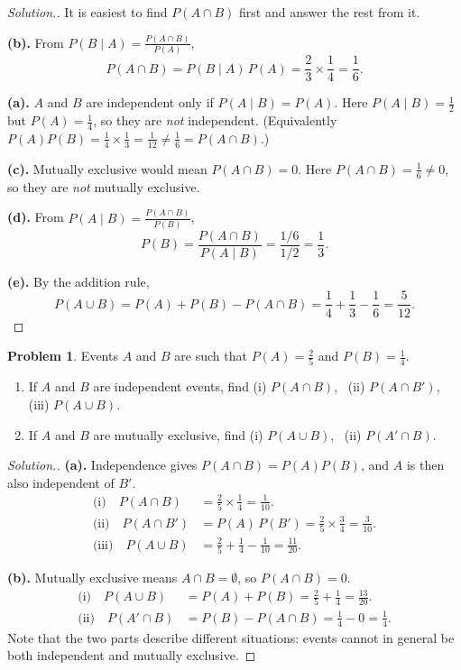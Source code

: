 \documentclass[12pt,a4paper]{report}
\theoremstyle{definition}
\theoremstyle{plain}
\theoremstyle{definition}
\newtheorem{problemx}{Problem}[section]
\newenvironment{problem}{\begin{problemx}}{\end{problemx}}
\newenvironment{solution}
  {\renewcommand{\qedsymbol}{}\begin{proof}[\textit{Solution}.]}
  {\end{proof}}
\begin{document}
\begin{solution}
It is easiest to find $P(A\cap B)$ first and answer the rest from it.

\textbf{(b).} From $P(B\mid A)=\frac{P(A\cap B)}{P(A)}$,
\[P(A\cap B) = P(B\mid A)\,P(A) = \frac{2}{3}\times\frac{1}{4} = \frac{1}{6}.\]

\textbf{(a).} $A$ and $B$ are independent only if $P(A\mid B)=P(A)$. Here
$P(A\mid B)=\tfrac12$ but $P(A)=\tfrac14$, so they are \emph{not} independent. (Equivalently
$P(A)P(B)=\tfrac14\times\tfrac13=\tfrac1{12}\neq\tfrac16=P(A\cap B)$.)

\textbf{(c).} Mutually exclusive would mean $P(A\cap B)=0$. Here $P(A\cap B)=\tfrac16\neq 0$,
so they are \emph{not} mutually exclusive.

\textbf{(d).} From $P(A\mid B)=\frac{P(A\cap B)}{P(B)}$,
\[P(B) = \frac{P(A\cap B)}{P(A\mid B)} = \frac{1/6}{1/2} = \frac{1}{3}.\]

\textbf{(e).} By the addition rule,
\[P(A\cup B) = P(A)+P(B)-P(A\cap B) = \frac{1}{4}+\frac{1}{3}-\frac{1}{6} = \frac{5}{12}.\]
\end{solution}

\begin{problem}
Events $A$ and $B$ are such that $P(A)=\frac{2}{5}$ and $P(B)=\frac{1}{4}$.
\begin{enumerate}
\item[(a).] If $A$ and $B$ are independent events, find
 (i) $P(A\cap B)$, \, (ii) $P(A\cap B')$, \, (iii) $P(A\cup B)$.
\item[(b).] If $A$ and $B$ are mutually exclusive, find
 (i) $P(A\cup B)$, \, (ii) $P(A'\cap B)$.
\end{enumerate}
\end{problem}

\begin{solution}
\textbf{(a).} Independence gives $P(A\cap B)=P(A)P(B)$, and $A$ is then also independent
of $B'$.
\begin{align*}
\text{(i)}\quad P(A\cap B) &= \frac{2}{5}\times\frac{1}{4} = \frac{1}{10}.\\
\text{(ii)}\quad P(A\cap B') &= P(A)\,P(B') = \frac{2}{5}\times\frac{3}{4} = \frac{3}{10}.\\
\text{(iii)}\quad P(A\cup B) &= \frac{2}{5}+\frac{1}{4}-\frac{1}{10} = \frac{11}{20}.
\end{align*}

\textbf{(b).} Mutually exclusive means $A\cap B=\emptyset$, so $P(A\cap B)=0$.
\begin{align*}
\text{(i)}\quad P(A\cup B) &= P(A)+P(B) = \frac{2}{5}+\frac{1}{4} = \frac{13}{20}.\\
\text{(ii)}\quad P(A'\cap B) &= P(B)-P(A\cap B) = \frac{1}{4}-0 = \frac{1}{4}.
\end{align*}
Note that the two parts describe different situations: events cannot in general be both
independent and mutually exclusive.
\end{solution}
\end{document}
